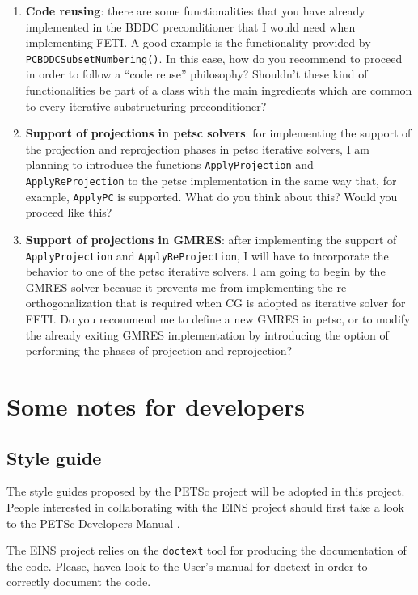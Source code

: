 \documentclass[a4paper,11pt]{report}
\begin{document}
\begin{enumerate}
\item \textbf{Code reusing}: there are some functionalities
  that you have already implemented in the BDDC preconditioner that I
  would need when implementing FETI. A good example is the functionality
  provided by \verb!PCBDDCSubsetNumbering()!. In this case, how do you
  recommend to proceed in order to follow a ``code reuse'' philosophy?
  Shouldn't these kind of functionalities be part of a class with the
  main ingredients which are common to every iterative substructuring
  preconditioner?

\item \textbf{Support of projections in petsc solvers}: for implementing
  the support of the projection and reprojection phases in petsc iterative
  solvers, I am planning to introduce the functions
  \verb!ApplyProjection! and \verb!ApplyReProjection! to the petsc
  implementation in the same way that, for example, \verb!ApplyPC! is
  supported. What do you think about this? Would you proceed like
  this?

\item \textbf{Support of projections in GMRES}: after implementing the
  support of \verb!ApplyProjection! and \verb!ApplyReProjection!, I
  will have to incorporate the behavior to one of the petsc iterative
  solvers. I am going to begin by the GMRES solver because it prevents
  me from implementing the re-orthogonalization that is required when
  CG is adopted as iterative solver for FETI. Do you recommend me to
  define a new GMRES in petsc, or to modify the already exiting GMRES
  implementation by introducing the option of performing the phases of
  projection and reprojection?

\end{enumerate}

\chapter{Some notes for developers}

\section{Style guide}

The style guides proposed by the PETSc project will be adopted in this
project. People interested in collaborating with the EINS project
should first take a look to the PETSc Developers Manual
\cite{petsc-dev}.

The EINS project relies on the \verb!doctext! tool for producing the
documentation of the code. Please, havea look to the User's manual for
doctext \cite{doctext} in order to correctly document the code.
\end{document}
